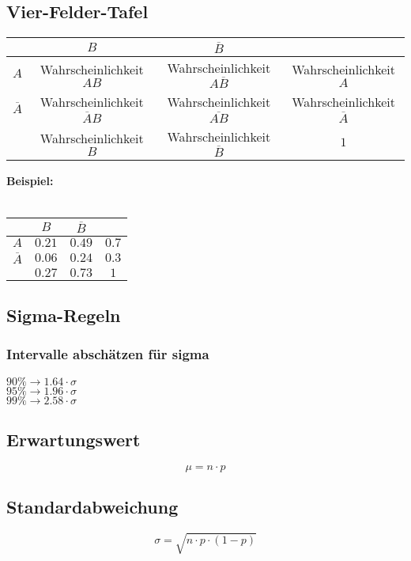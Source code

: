 	\subsection{Vier-Felder-Tafel}
	\begin{center}
	\begin{tabular}{|c|c|c|c|}
	\hline 
	 & $B$ & $\overline{B}$ &  \\ 
	\hline
	$A$ & Wahrscheinlichkeit $AB$ & Wahrscheinlichkeit $A\overline{B}$ & Wahrscheinlichkeit $A$ \\ 
	\hline
	$\overline{A}$ & Wahrscheinlichkeit $\overline{A}B$ & Wahrscheinlichkeit $\overline{AB}$ & Wahrscheinlichkeit $\overline{A}$ \\ 
	\hline
	 & Wahrscheinlichkeit $B$ & Wahrscheinlichkeit $\overline{B}$ & $1$ \\ 
	\hline 
	\end{tabular} 
	\end{center}
	\textbf{Beispiel:} \\
	\\
	\begin{tabular}{|c|c|c|c|}
	\hline 
	 & $B$ & $\overline{B}$ &  \\ 
	\hline
	$A$ & $0.21$ & $0.49$ & $0.7$ \\ 
	\hline
	$\overline{A}$ & $0.06$ & $0.24$ & $0.3$ \\ 
	\hline
	 & $0.27$ & $0.73$ & $1$ \\ 
	\hline 
	\end{tabular}
	\subsection{Sigma-Regeln}
	\subsubsection{Intervalle abschätzen für sigma}
	\begin{center}
	$90\% \rightarrow 1.64 \cdot \sigma$ \\
	$95\% \rightarrow 1.96 \cdot \sigma$ \\
	$99\% \rightarrow 2.58 \cdot \sigma$
	\end{center}
	
	\subsection{Erwartungswert}
	$$ \mu = n \cdot p $$
	\subsection{Standardabweichung}
	$$ \sigma = \sqrt{n \cdot p \cdot (1-p)} $$
